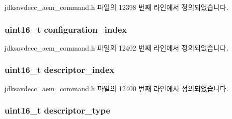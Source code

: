 jdksavdecc\+\_\+aem\+\_\+command.\+h 파일의 12398 번째 라인에서 정의되었습니다.

\subsubsection[{\texorpdfstring{configuration\+\_\+index}{configuration_index}}]{\setlength{\rightskip}{0pt plus 5cm}uint16\+\_\+t configuration\+\_\+index}\hypertarget{structjdksavdecc__aem__command__set__name_afaad1bd7c66f9611e134d8c5ce98f444}{}\label{structjdksavdecc__aem__command__set__name_afaad1bd7c66f9611e134d8c5ce98f444}


jdksavdecc\+\_\+aem\+\_\+command.\+h 파일의 12402 번째 라인에서 정의되었습니다.

\subsubsection[{\texorpdfstring{descriptor\+\_\+index}{descriptor_index}}]{\setlength{\rightskip}{0pt plus 5cm}uint16\+\_\+t descriptor\+\_\+index}\hypertarget{structjdksavdecc__aem__command__set__name_a042bbc76d835b82d27c1932431ee38d4}{}\label{structjdksavdecc__aem__command__set__name_a042bbc76d835b82d27c1932431ee38d4}


jdksavdecc\+\_\+aem\+\_\+command.\+h 파일의 12400 번째 라인에서 정의되었습니다.

\subsubsection[{\texorpdfstring{descriptor\+\_\+type}{descriptor_type}}]{\setlength{\rightskip}{0pt plus 5cm}uint16\+\_\+t descriptor\+\_\+type}\hypertarget{structjdksavdecc__aem__command__set__name_ab7c32b6c7131c13d4ea3b7ee2f09b78d}{}\label{structjdksavdecc__aem__command__set__name_ab7c32b6c7131c13d4ea3b7ee2f09b78d}


